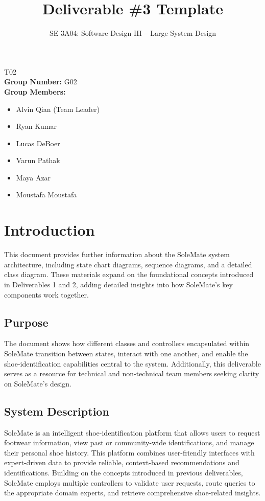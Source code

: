 \documentclass[]{article}
\title{Deliverable \#3 Template}
\author{SE 3A04: Software Design III -- Large System Design}
\date{}
\begin{document}
\maketitle	
{} T02\\
{\bf Group Number:} G02 \\
{\bf Group Members:} 
\begin{itemize}
	\item Alvin Qian (Team Leader)
	\item Ryan Kumar
	\item Lucas DeBoer
	\item Varun Pathak
	\item Maya Azar
	\item Moustafa Moustafa
\end{itemize}

\newpage

\section{Introduction}
\label{sec:introduction}

This document provides further information about the SoleMate system architecture, including state chart diagrams, sequence diagrams, and a detailed class diagram. These materials expand on the foundational concepts introduced in Deliverables 1 and 2, adding detailed insights into how SoleMate’s key components work together.

\subsection{Purpose}
\label{sub:purpose}
The document shows how different classes and controllers encapsulated within SoleMate transition between states, interact with one another, and enable the shoe-identification capabilities central to the system.
Additionally, this deliverable serves as a resource for technical and non-technical team members seeking clarity on SoleMate’s design. 

\subsection{System Description}
\label{sub:system_description}
SoleMate is an intelligent shoe-identification platform that allows users to request footwear information, view past or community-wide identifications, and manage their personal shoe history. This platform combines user-friendly interfaces with expert-driven data to provide reliable, context-based recommendations and identifications.
Building on the concepts introduced in previous deliverables, SoleMate employs multiple controllers to validate user requests, route queries to the appropriate domain experts, and retrieve comprehensive shoe-related insights. 
\end{document}
